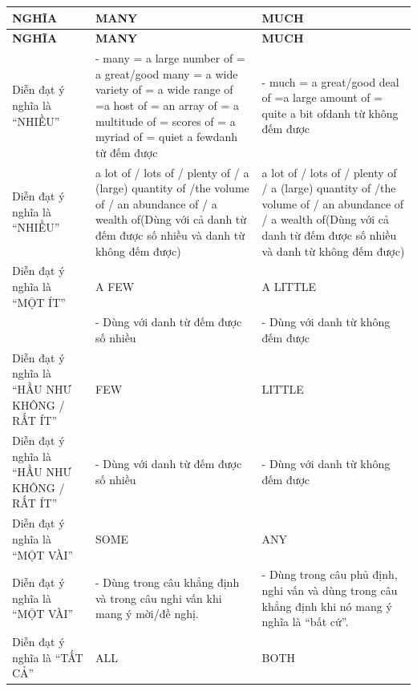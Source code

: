 \documentclass[12pt,a4paper,twoside]{article}
\begin{document}
{\small
\renewcommand{\arraystretch}{1.25}
\begin{longtable}{|>{\raggedright\arraybackslash}p{}|>{\raggedright\arraybackslash}p{}|>{\raggedright\arraybackslash}p{}|}
\hline
\rowcolor{pastelBlue}
\textbf{NGHĨA} & \textbf{MANY} & \textbf{MUCH} \\
\hline
\endfirsthead
\hline
\rowcolor{pastelBlue}
\textbf{NGHĨA} & \textbf{MANY} & \textbf{MUCH} \\
\hline
\endhead
\endfoot
\endlastfoot
Diễn đạt ý nghĩa là “NHIỀU” & - many = a large number of = a great/good many = a wide variety of = a wide range of =\newline a host of = an array of = a multitude of = scores of = a myriad of = quiet a few\newline danh từ đếm được & - much = a great/good deal of =\newline a large amount of = quite a bit of\newline danh từ không đếm được \\
\hline
Diễn đạt ý nghĩa là “NHIỀU” & a lot of / lots of / plenty of / a (large) quantity of /\newline the volume of / an abundance of / a wealth of\newline (Dùng với cả danh từ đếm được số nhiều và danh từ không đếm được) & a lot of / lots of / plenty of / a (large) quantity of /\newline the volume of / an abundance of / a wealth of\newline (Dùng với cả danh từ đếm được số nhiều và danh từ không đếm được) \\
\hline
Diễn đạt ý nghĩa là “MỘT ÍT” & A FEW & A LITTLE \\
\hline
~ & - Dùng với danh từ đếm được số nhiều & - Dùng với danh từ không đếm được \\
\hline
Diễn đạt ý nghĩa là “HẦU NHƯ KHÔNG / RẤT ÍT” & FEW & LITTLE \\
\hline
Diễn đạt ý nghĩa là “HẦU NHƯ KHÔNG / RẤT ÍT” & - Dùng với danh từ đếm được số nhiều & - Dùng với danh từ không đếm được \\
\hline
Diễn đạt ý nghĩa là “MỘT VÀI” & SOME & ANY \\
\hline
Diễn đạt ý nghĩa là “MỘT VÀI” & - Dùng trong câu khẳng định và trong câu nghi vấn khi mang ý mời/đề nghị. & - Dùng trong câu phủ định, nghi vấn và dùng trong câu khẳng định khi nó mang ý nghĩa là “bất cứ”. \\
\hline
Diễn đạt ý nghĩa là “TẤT CẢ” & ALL & BOTH \\

\end{longtable}}
\end{document}
